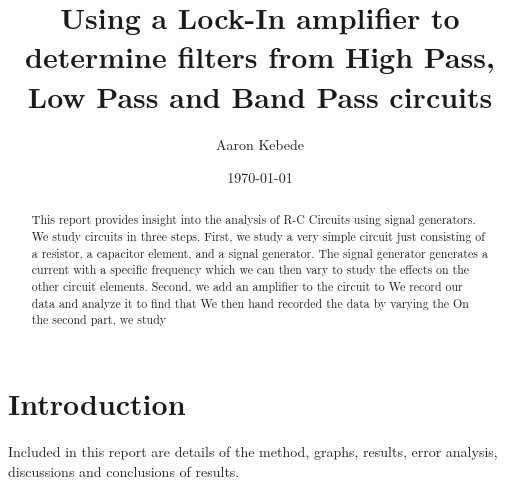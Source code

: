 \documentclass[a4paper]{article}\usepackage[english]{babel}
\title{Using a Lock-In amplifier to determine filters from High Pass, Low Pass and Band Pass circuits }
\author{Aaron Kebede}
\date{\today}
\begin{document}
\maketitle
\begin{abstract}

This report provides insight into the analysis of R-C Circuits using signal generators. We study circuits in three steps. First, we study a very simple circuit just consisting of a resistor, a capacitor element, and a signal generator. The signal generator generates a current with a specific frequency which we can then vary to study the effects on the other circuit elements. Second, we add an amplifier to the circuit to
We record our data and analyze it to find that  We then hand recorded the data by varying the On the second part, we study 

\end{abstract}

\section{Introduction}

Included in this report are details of the method, graphs, results, error analysis, discussions and conclusions of results.
\end{document}
